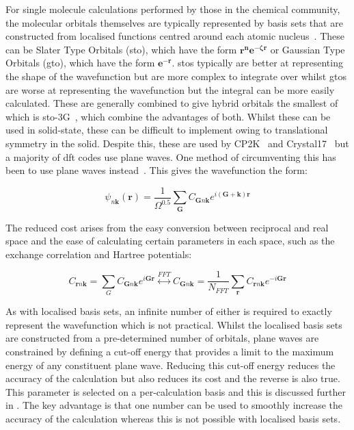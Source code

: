 For single molecule calculations performed by those in the chemical community, the molecular orbitals themselves are typically represented by basis sets that are constructed from localised functions centred around each atomic nucleus~\cite{Huzinaga1985}. These can be Slater Type Orbitals (\acrshort{sto}), which have the form \(\boldsymbol{r^ne^{-\zeta r}}\) or Gaussian Type Orbitals (\acrshort{gto}), which have the form \(\boldsymbol{e^{-r}}\). \acrshort{sto}s typically are better at representing the shape of the wavefunction but are more complex to integrate over whilst \acrshort{gto}s are worse at representing the wavefunction but the integral can be more easily calculated. These are generally combined to give hybrid orbitals the smallest of which is \acrshort{sto}\nobreakdash-3G~\cite{Halgren1978}, which combine the advantages of both. Whilst these can be used in solid\nobreakdash-state, these can be difficult to implement owing to translational symmetry in the solid. Despite this, these are used by CP2K~\cite{Khne2020} and Crystal17~\cite{dovesi2020crystal} but a majority of \acrshort{dft} codes use plane waves. One method of circumventing this has been to use plane waves instead~\cite{Hohenberg1964}. This gives the wavefunction the form: 

\begin{equation}
\psi_{n\mathbf{k}}(\mathbf{r}) = \frac{1}{\Omega^{0.5}} \sum_{\boldsymbol{G}} C_{\boldsymbol{G}n\mathbf{k}}e^{i(\boldsymbol{G}+\mathbf{k})\mathbf{r}}
\end{equation}

The reduced cost arises from the easy conversion between reciprocal and real space and the ease of calculating certain parameters in each space, such as the exchange correlation and Hartree potentials:

\begin{equation}
C_{\mathbf{r}n\mathbf{k}} = \sum_G C_{\boldsymbol{G}n\mathbf{k}} e^{i\boldsymbol{G}\mathbf{r}} \overset{FFT}{\leftrightarrow} C_{\mathbf{G}n\mathbf{k}} = \frac{1}{N_{FFT}} \sum_{\mathbf{r}} C_{\boldsymbol{r}n\mathbf{k}} e^{-i\boldsymbol{G}\mathbf{r}}
\end{equation}

As with localised basis sets, an infinite number of either is required to exactly represent the wavefunction which is not practical. Whilst the localised basis sets are constructed from a pre\nobreakdash-determined number of orbitals, plane waves are constrained by defining a cut\nobreakdash-off energy that provides a limit to the maximum energy of any constituent plane wave. Reducing this cut\nobreakdash-off energy reduces the accuracy of the calculation but also reduces its cost and the reverse is also true. This parameter is selected on a per\nobreakdash-calculation basis and this is discussed further in . The key advantage is that one number can be used to smoothly increase the accuracy of the calculation whereas this is not possible with localised basis sets.


